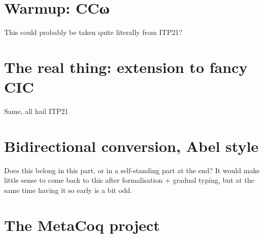 \documentclass[
  french,english,
	fontsize=10pt, %
	twoside=true, %
	secnumdepth=1, %
]{kaobook/kaobook}
\begin{document}



\mainmatter %










\label{part:bidir}

\chapter{Warmup: CCω}
\label{chap:bidir-ccw}

This could probably be taken quite literally from ITP21?

\chapter{The real thing: extension to fancy CIC}
\label{chap:bidir-cic}

Same, all hail ITP21

\chapter{Bidirectional conversion, Abel style}
\label{chap:bidir-conv}

Does this belong in this part, or in a self-standing part at the end?
It would make little sense to come back to this after formalisation + gradual typing,
but at the same time having it so early is a bit odd.

\label{part:metacoq}

\chapter{The MetaCoq project}
\label{chap:metacoq-general}
\end{document}
